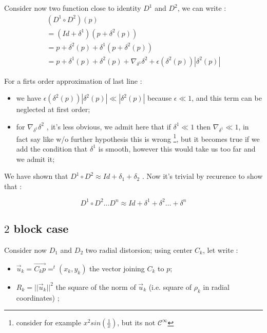 Consider now two function close to identity $D^1$ and $D^2$, we can write :
\begin{equation}
\begin{multlined}
(D^1 \circ D^2)(p)  \\
=  (Id+\delta^1)(p+\delta^2(p))\\
=  p +\delta^2(p) + \delta^1(p+\delta^2(p)) \\
=  p +\delta^1(p) + \delta^2(p) + \nabla_{\delta^1} \delta^2   + \epsilon(\delta^2(p)) |\delta^2(p)|
\end{multlined}
\end{equation}

For a firts order approximation of last line :

\begin{itemize}
   \item we have $\epsilon(\delta^2(p)) |\delta^2(p)|  \ll |\delta^2(p)|$ because $\epsilon\ll 1$,
          and this term can be neglected at first order;

   \item  for  $ \nabla_{\delta^1} \delta^2$ , it's less obvious, we admit here that
          if $\delta^1 \ll 1$ then $ \nabla_{\delta^1} \ll 1$,  in fact say like w/o further hypothesis this
		is wrong \footnote{consider for example $x^2 sin(\frac{1}{x})$, but its not $\mathcal{C}^\infty$}, but it becomes
          true if we add the condition that $\delta^1$ is smooth, however this would take us too far  and we admit it;
\end{itemize}

We have shown that $D^1 \circ D^2  \approx Id + \delta_1 + \delta_2$ .  Now it's trivial by recurence to
show that :

\begin{equation}
     D^1 \circ D^2   \dots D^n  \approx Id + \delta^1 + \delta^2 \dots + \delta^n
\end{equation}


\subsection{$2$ block case}

Consider now $D_1$ and $D_2$ two  radial distorsion; using center $C_k$, let write :

\begin{itemize}
	\item $\vec{u}_k = \overrightarrow{C_k p} = ^t (x_k,y_k) $ the vector joining $C_k$ to $p$;
	\item $R_k = ||\vec{u}_k||^2$  the square of the norm of $\vec{u}_k$ (i.e.  square of $\rho_k$ in radial coordinates) ;
\end{itemize}


